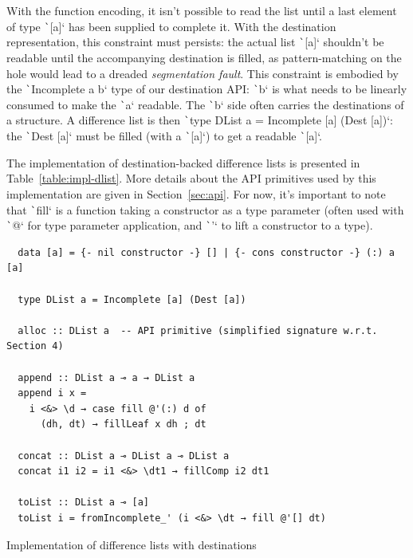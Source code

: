 \documentclass[english]{jflart}
\begin{document}
With the function encoding, it isn't possible to read the list until a last element of type \texttt`[a]` has been supplied to complete it. With the destination representation, this constraint must persists: the actual list \texttt`[a]` shouldn't be readable until the accompanying destination is filled, as pattern-matching on the hole would lead to a dreaded \emph{segmentation fault}. This constraint is embodied by the \texttt`Incomplete a b` type of our destination API: \texttt`b` is what needs to be linearly consumed to make the \texttt`a` readable. The \texttt`b` side often carries the destinations of a structure. A difference list is then \texttt`type DList a = Incomplete [a] (Dest [a])`: the \texttt`Dest [a]` must be filled (with a \texttt`[a]`) to get a readable \texttt`[a]`.

The implementation of destination-backed difference lists is presented in Table~\ref{table:impl-dlist}. More details about the API primitives used by this implementation are given in Section~\ref{sec:api}. For now, it's important to note that \texttt`fill` is a function taking a constructor as a type parameter (often used with \texttt`@` for type parameter application, and \texttt`'` to lift a constructor to a type).

\begin{table}[p]
  \small
  \begin{verbatim}
  data [a] = {- nil constructor -} [] | {- cons constructor -} (:) a [a]
  
  type DList a = Incomplete [a] (Dest [a])
  
  alloc :: DList a  -- API primitive (simplified signature w.r.t. Section 4)
  
  append :: DList a ⊸ a → DList a
  append i x =
    i <&> \d → case fill @'(:) d of
      (dh, dt) → fillLeaf x dh ; dt
  
  concat :: DList a ⊸ DList a ⊸ DList a
  concat i1 i2 = i1 <&> \dt1 → fillComp i2 dt1
  
  toList :: DList a ⊸ [a]
  toList i = fromIncomplete_' (i <&> \dt → fill @'[] dt)
  \end{verbatim}
  \caption{Implementation of difference lists with destinations}
  \label{table:impl-dlist}
  \end{table}
\end{document}
